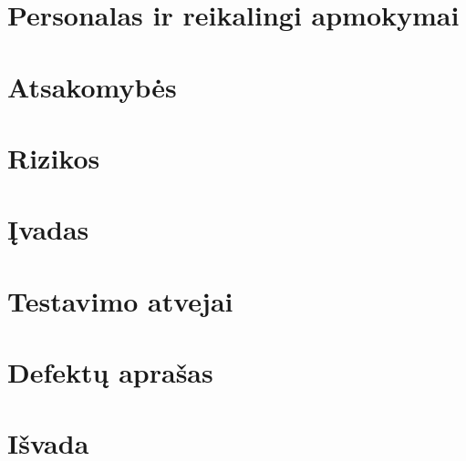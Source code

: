 \documentclass{VUMIFPSkursinis}
\begin{document}
\section{Personalas ir reikalingi apmokymai}
\section{Atsakomybės}
\section{Rizikos}
\section{Įvadas}
\section{Testavimo atvejai}
\section{Defektų aprašas}
\section{Išvada}
\end{document}
